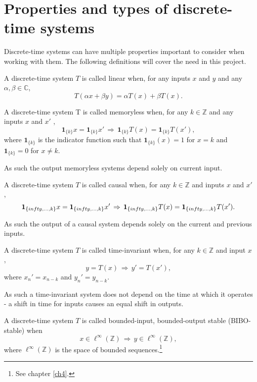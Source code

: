 \section{Properties and types of discrete-time systems}\label{sec:properties_DTS}
Discrete-time systems can have multiple properties important to consider when working with them. The following definitions will cover the need in this project.
\begin{definition}\label{def:linear_system}
A discrete-time system $T$ is called linear when, for any inputs $x$ and $y$ and any $\alpha,\beta\in\mathbb{C}$,
\begin{equation}
T(\alpha x+\beta y)=\alpha T(x)+\beta T(x).
\end{equation}
\end{definition}
\begin{definition}\label{def:memoryless_system}
A discrete-time system T is called memoryless when, for any $k\in\mathbb{Z}$ and any inputs $x$ and $x'$ ,
\begin{equation}
\mathbf{1}_{\{k\}}x=\mathbf{1}_{\{k\}}x'\,\Rightarrow\,\mathbf{1}_{\{k\}}T(x)=\mathbf{1}_{\{k\}}T(x'),
\end{equation}
where $\mathbf{1}_{\{k\}}$ is the indicator function such that $\mathbf{1}_{\{k\}}(x)=1$ for $x=k$ and $\mathbf{1}_{\{k\}}=0$ for $x\neq k$.
\end{definition}
As such the output memoryless systems depend solely on current input.
\begin{definition}\label{def:causal_system}
A discrete-time system $T$ is called causal when, for any $k\in\mathbb{Z}$ and inputs $x$ and $x'$,
\begin{equation}
\mathbf{1}_{\{\-infty,\ldots,k\}}x=\mathbf{1}_{\{\-infty,\ldots,k\}}x'\,\Rightarrow\,\mathbf{1}_{\{\-infty,\ldots,k\}}T(x)=\mathbf{1}_{\{\-infty,\ldots,k\}}T(x').
\end{equation}
\end{definition}
As such the output of a causal system depends solely on the current and previous inputs.
\begin{definition}\label{def:time_invariant_system}
A discrete-time system $T$ is called time-invariant when, for any $k\in\mathbb{Z}$ and input $x$,
\begin{equation}
y=T(x)\,\Rightarrow\,y'=T(x'),
\end{equation}
where $x_n'=x_{n-k}$ and $y_n'=y_{n-k}$.
\end{definition}
As such a time-invariant system does not depend on the time at which it operates - a shift in time for inputs causes an equal shift in outputs.
\begin{definition}\label{def:BIBO_stable_system}
A discrete-time system $T$ is called bounded-input, bounded-output stable (BIBO-stable) when
\begin{equation}
x\in\ell^{\infty}(\mathbb{Z})\,\Rightarrow\,y\in\ell^{\infty}(\mathbb{Z}),
\end{equation}
where $\ell^{\infty}(\mathbb{Z})$ is the space of bounded sequences.\footnote{See chapter \ref{ch4}.}
\end{definition}
